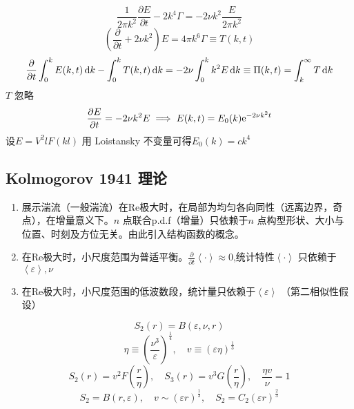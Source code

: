 \documentclass[12pt]{ctexart}
\begin{document}
\begin{equation}
   \frac{1}{2\pi k^2} \frac{\partial E}{\partial t}  - 2k^4 \Gamma = -2 \nu k^2 \frac{E}{2\pi k^2}
\end{equation}
\begin{equation}
   \left( \frac{\partial }{\partial t} + 2\nu k^2 \right) E = 4\pi k^6 \Gamma \equiv T(k,t) 
\end{equation}
\begin{equation}
   \frac{\partial }{\partial t} \int_0^k E(k,t) \dif k - \int_0^k T(k,t)\dif k = -2 \nu \int_0^k k^2 E \dif k \equiv \Pi(k,t) = \int_k^{\infty} T \dif k
\end{equation}
$T$ 忽略
\begin{equation}
   \frac{\partial E}{\partial t} = -2 \nu k^2 E \implies E(k,t) = E_0(k) \mathrm{e}^{-2\nu k^2t}
\end{equation}
设$E = V^2 l F(kl)$ 用 Loistansky 不变量可得$ E_0(k) = ck^4$

\subsection{Kolmogorov 1941 理论}

\begin{enumerate}
   \item 展示湍流（一般湍流）在Re极大时，在局部为均匀各向同性（远离边界，奇点），在增量意义下。$n$ 点联合p.d.f（增量）只依赖于$n$ 点构型形状、大小与位置、时刻及方位无关。由此引入结构函数的概念。
   \item 在Re极大时，小尺度范围为普适平衡。$ \frac{\partial }{\partial t} \left<\cdot \right> \approx 0$,统计特性$\left<\cdot \right>$ 只依赖于$\left<\varepsilon\right>,\nu$
   \item 在Re极大时，小尺度范围的低波数段，统计量只依赖于$\left<\varepsilon \right>$ （第二相似性假设）
\end{enumerate}
\begin{equation}
   S_2(r) = B(\varepsilon, \nu, r)
\end{equation}
\begin{equation}
   \eta \equiv \left( \frac{\nu^3}{\varepsilon} \right) ^{\frac{1}{4}},\quad v \equiv (\varepsilon \eta)^{\frac{1}{3}}
\end{equation}
\begin{equation}
   S_2(r) = v^2 F \left( \frac{r}{\eta} \right),\quad S_3(r) = v^3 G(\frac{r}{\eta}),\quad \frac{\eta v}{\nu} = 1
\end{equation}
\begin{equation}
   S_2 = B(r,\varepsilon),\quad v \sim (\varepsilon r)^{\frac{1}{3}},\quad S_2 = C_2 (\varepsilon r)^{\frac{2}{3}}
\end{equation}
\end{document}
